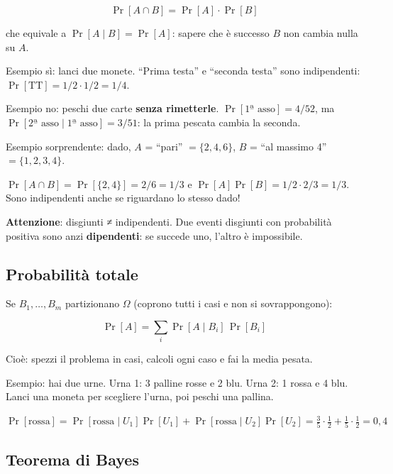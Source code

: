 \[
\Pr[A \cap B] = \Pr[A] \cdot \Pr[B]
\]

che equivale a \(\Pr[A \mid B] = \Pr[A]\): sapere che è successo \(B\) non cambia nulla su \(A\).

\begin{esempio}

Esempio sì: lanci due monete. ``Prima testa'' e ``seconda testa'' sono indipendenti: \(\Pr[\text{TT}] = 1/2 \cdot 1/2 = 1/4\).

Esempio no: peschi due carte \textbf{senza rimetterle}. \(\Pr[\text{1ª asso}] = 4/52\), ma \(\Pr[\text{2ª asso} \mid \text{1ª asso}] = 3/51\): la prima pescata cambia la seconda.

Esempio sorprendente: dado, \(A\) = ``pari'' \(= \{2,4,6\}\), \(B\) = ``al massimo 4'' \(= \{1,2,3,4\}\).

\(\Pr[A \cap B] = \Pr[\{2,4\}] = 2/6 = 1/3\) e \(\Pr[A]\Pr[B] = 1/2 \cdot 2/3 = 1/3\). Sono indipendenti anche se riguardano lo stesso dado!

\end{esempio}

\textbf{Attenzione}: disgiunti ≠ indipendenti. Due eventi disgiunti con probabilità positiva sono anzi \textbf{dipendenti}: se succede uno, l'altro è impossibile.

\subsection{Probabilità totale}

Se \(B_1, \dots, B_m\) partizionano \(\Omega\) (coprono tutti i casi e non si sovrappongono):

\[
\Pr[A] = \sum_{i} \Pr[A \mid B_i]\,\Pr[B_i]
\]

Cioè: spezzi il problema in casi, calcoli ogni caso e fai la media pesata.

\begin{esempio}

Esempio: hai due urne. Urna 1: 3 palline rosse e 2 blu. Urna 2: 1 rossa e 4 blu. Lanci una moneta per scegliere l'urna, poi peschi una pallina.

\(\Pr[\text{rossa}] = \Pr[\text{rossa} \mid U_1]\Pr[U_1] + \Pr[\text{rossa} \mid U_2]\Pr[U_2] = \tfrac{3}{5}\cdot\tfrac{1}{2} + \tfrac{1}{5}\cdot\tfrac{1}{2} = 0{,}4\)

\end{esempio}

\subsection{Teorema di Bayes}

